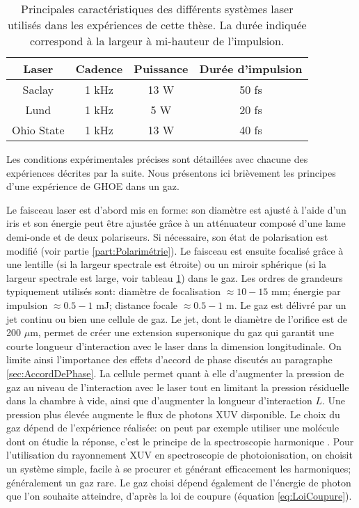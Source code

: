 \begin{table}[ht]
\begin{center}
\begin{tabular}{|c||c|c|c|}
\hline
Laser & Cadence & Puissance & Durée d'impulsion \\
\hline
Saclay & 1 kHz & 13 W & 50 fs \\
\hline
Lund & 1 kHz & 5 W & 20 fs  \\
\hline
Ohio State & 1 kHz & 13 W & 40 fs\\
\hline
\end{tabular}
\end{center}
\caption{Principales caractéristiques des différents systèmes laser utilisés dans les expériences de cette thèse. La durée indiquée correspond à la largeur à mi-hauteur de l'impulsion.}
\label{tab:Lasers}
\end{table}

Les conditions expérimentales précises sont détaillées avec chacune des expériences décrites par la suite. Nous présentons ici brièvement les principes d'une expérience de GHOE dans un gaz.

Le faisceau laser est d'abord mis en forme: son diamètre est ajusté à l'aide d'un iris et son énergie peut être ajustée grâce à un atténuateur composé d'une lame demi-onde et de deux polariseurs. Si nécessaire, son état de polarisation est modifié (voir partie \ref{part:Polarimétrie}). Le faisceau est ensuite focalisé grâce à une lentille (si la largeur spectrale est étroite) ou un miroir sphérique (si la largeur spectrale est large, voir tableau \ref{tab:Lasers}) dans le gaz. Les ordres de grandeurs typiquement utilisés sont: diamètre de focalisation $\approx 10 - 15$ mm; énergie par impulsion $\approx 0.5 - 1$ mJ; distance focale $\approx 0.5 - 1$ m. Le gaz est délivré par un jet continu ou bien une cellule de gaz. Le jet, dont le diamètre de l'orifice est de 200 $\mu$m, permet de créer une extension supersonique du gaz qui garantit une courte longueur d'interaction avec le laser dans la dimension longitudinale. On limite ainsi l'importance des effets d'accord de phase discutés au paragraphe \ref{sec:AccordDePhase}. La cellule permet quant à elle d'augmenter la pression de gaz au niveau de l'interaction avec le laser tout en limitant la pression résiduelle dans la chambre à vide, ainsi que d'augmenter la longueur d'interaction $L$. Une pression plus élevée augmente le flux de photons XUV disponible. Le choix du gaz dépend de l'expérience réalisée: on peut par exemple utiliser une molécule dont on étudie la réponse, c'est le principe de la spectroscopie harmonique . Pour l'utilisation du rayonnement XUV en spectroscopie de photoionisation, on choisit un système simple, facile à se procurer et générant efficacement les harmoniques; généralement un gaz rare. Le gaz choisi dépend également de l'énergie de photon que l'on souhaite atteindre, d'après la loi de coupure (équation \ref{eq:LoiCoupure}).

